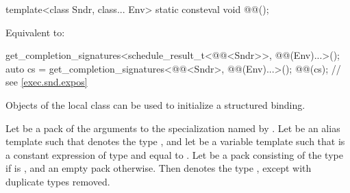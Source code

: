 \begin{itemdecl}
template<class Sndr, class... Env>
  static consteval void @@();
\end{itemdecl}

\begin{itemdescr}
\pnum
\effects
Equivalent to:
\begin{codeblock}
get_completion_signatures<schedule_result_t<@@<Sndr>>, @@(Env)...>();
auto cs = get_completion_signatures<@@<Sndr>, @@(Env)...>();
@@(cs);   // see \ref{exec.snd.expos}
\end{codeblock}
\end{itemdescr}

\pnum
Objects of the local class  can be used
to initialize a structured binding.

\pnum
Let  be
a pack of the arguments to the  specialization
named by .
Let  be an alias template such that
 denotes
the type , and
let  be a variable template such that
 is
a constant expression of type  and
equal to .
Let  be a pack consisting of
the type 
if  is ,
and an empty pack otherwise.
Then  denotes
the type ,
except with duplicate types removed.

